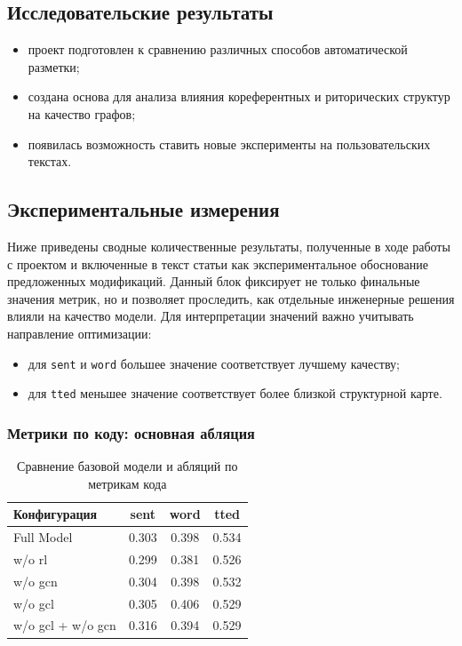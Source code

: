 \documentclass[12pt,a4paper]{article}
\begin{document}
\subsection{Исследовательские результаты}

\begin{itemize}
    \item проект подготовлен к сравнению различных способов автоматической разметки;
    \item создана основа для анализа влияния кореферентных и риторических структур на
    качество графов;
    \item появилась возможность ставить новые эксперименты на пользовательских текстах.
\end{itemize}

\subsection{Экспериментальные измерения}

Ниже приведены сводные количественные результаты, полученные в ходе работы с проектом
и включенные в текст статьи как экспериментальное обоснование предложенных
модификаций. Данный блок фиксирует не только финальные значения метрик, но и
позволяет проследить, как отдельные инженерные решения влияли на качество модели.
Для интерпретации значений важно учитывать направление оптимизации:

\begin{itemize}
    \item для \texttt{sent} и \texttt{word} большее значение соответствует лучшему
    качеству;
    \item для \texttt{tted} меньшее значение соответствует более близкой структурной карте.
\end{itemize}

\subsubsection{Метрики по коду: основная абляция}

\begin{table}[H]
\centering
\caption{Сравнение базовой модели и абляций по метрикам кода}
\begin{tabular}{lccc}
\toprule
Конфигурация & sent & word & tted \\
\midrule
Full Model & 0.303 & 0.398 & 0.534 \\
w/o rl & 0.299 & 0.381 & 0.526 \\
w/o gcn & 0.304 & 0.398 & 0.532 \\
w/o gcl & 0.305 & 0.406 & 0.529 \\
w/o gcl + w/o gcn & 0.316 & 0.394 & 0.529 \\
\bottomrule
\end{tabular}
\end{table}
\end{document}
